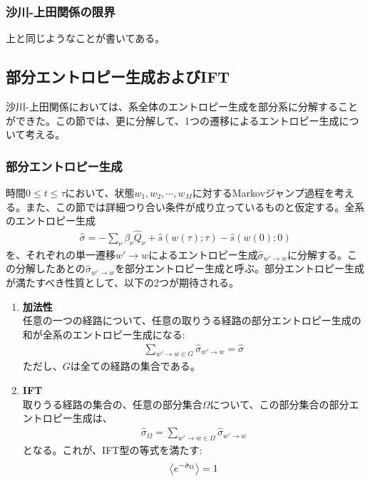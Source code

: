 \documentclass[a4paper,11pt]{jsarticle}
\numberwithin{equation}{section}
\begin{document}
\subsubsection{沙川-上田関係の限界}
上と同じようなことが書いてある。\\

\subsection{部分エントロピー生成およびIFT}
沙川-上田関係においては、系全体のエントロピー生成を部分系に分解することができた。この節では、更に分解して、1つの遷移によるエントロピー生成について考える。\\
\subsubsection{部分エントロピー生成}
時間$0 \leq t \leq \tau$において、状態$w_1, w_2, \cdots, w_M$に対するMarkovジャンプ過程を考える。また、この節では詳細つり合い条件が成り立っているものと仮定する。全系のエントロピー生成
\begin{align}
    \hat{\sigma} = -\sum_{\nu} \beta_{\nu} \hat{Q}_{\nu} + \hat{s}(w(\tau); \tau) - \hat{s}(w(0); 0)
\end{align}
を、それぞれの単一遷移$w' \to w$によるエントロピー生成$\hat{\sigma}_{w' \to w}$に分解する。この分解したあとの$\hat{\sigma}_{w' \to w}$を部分エントロピー生成と呼ぶ。部分エントロピー生成が満たすべき性質として、以下の2つが期待される。
\begin{enumerate}
    \item \textbf{加法性}\\
    任意の一つの経路について、任意の取りうる経路の部分エントロピー生成の和が全系のエントロピー生成になる:
    \begin{align}
        \sum_{w'\to w\in G} \hat{\sigma}_{w' \to w} = \hat{\sigma}
    \end{align}
    ただし、$G$は全ての経路の集合である。
    \item \textbf{IFT}\\
    取りうる経路の集合の、任意の部分集合$\Omega$について、この部分集合の部分エントロピー生成は、
    \begin{align}
        \hat{\sigma}_{\Omega} = \sum_{w' \to w \in \Omega} \hat{\sigma}_{w' \to w}
    \end{align}
    となる。これが、IFT型の等式を満たす:
    \begin{align}
        \ev{e^{-\hat{\sigma}_{\Omega}}} = 1
    \end{align}
\end{enumerate}
\end{document}
